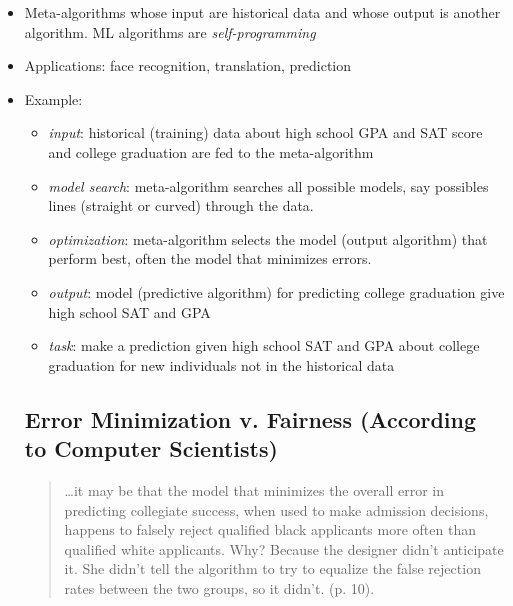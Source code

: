 \documentclass{tufte-handout}
\begin{document}
\begin{itemize}

\item[] Meta-algorithms whose input are historical data and whose output is another algorithm.
ML algorithms are \textit{self-programming} 

\item[] Applications: face recognition, translation, prediction


\item[] Example:

	\begin{itemize}
	\item[] \textit{input}: historical (training) data about high school GPA and SAT score and college graduation are fed to the meta-algorithm
	\item[]  \textit{model search}:    meta-algorithm searches all possible models, say possibles lines (straight or curved) through the data.
	\item[]  \textit{optimization}: 	 meta-algorithm selects the model (output algorithm) that perform best, often 
	the model that minimizes errors. 
	\item[] \textit{output}: model (predictive algorithm) for predicting college graduation give high school SAT and GPA 
	\item[] \textit{task}: make a prediction given high school SAT and GPA about college graduation for new individuals not in the historical data
	\end{itemize}

	


\subsection{Error Minimization v. Fairness (According to Computer Scientists)}

\begin{quote}
\dots it may be that the model that minimizes the overall error in predicting collegiate success, when used to make admission decisions, happens 
to falsely reject qualified black applicants more often than qualified white applicants. Why? Because the designer didn't anticipate it. She didn't tell the algorithm  to try to equalize the false rejection rates between the two groups, so it didn't. (p. 10).\end{quote}


\end{itemize}
\end{document}
